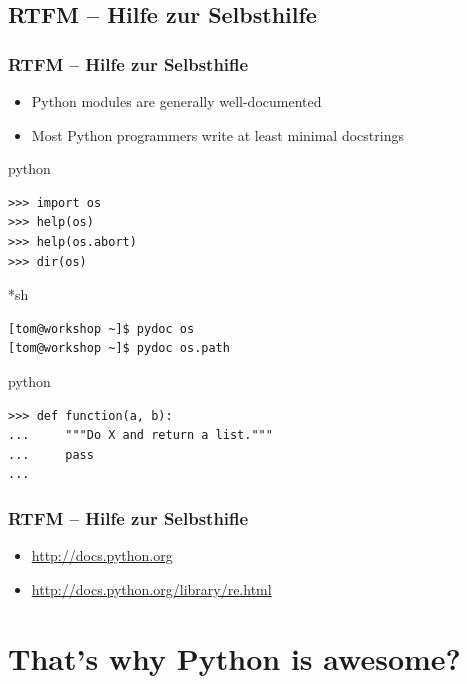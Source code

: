 \documentclass{beamer}
\begin{document}
\subsection{RTFM -- Hilfe zur Selbsthilfe}
\begin{frame}[fragile]
	\frametitle{RTFM -- Hilfe zur Selbsthifle}

	\begin{itemize}
		\item Python modules are generally well-documented
		\item Most Python programmers write at least minimal docstrings
	\end{itemize}

\pause

	\begin{exampleblock}{python}
	\begin{lstlisting}
>>> import os
>>> help(os)
>>> help(os.abort)
>>> dir(os)
	\end{lstlisting}
	\end{exampleblock}

\pause

	\begin{exampleblock}{*sh}
	\begin{lstlisting}[language=bash]
[tom@workshop ~]$ pydoc os
[tom@workshop ~]$ pydoc os.path
	\end{lstlisting}
	\end{exampleblock}

\pause

	\begin{exampleblock}{python}
	\begin{lstlisting}
>>> def function(a, b):
...     """Do X and return a list."""
...     pass
...
	\end{lstlisting}
	\end{exampleblock}
\end{frame}

\begin{frame}[fragile]
	\frametitle{RTFM -- Hilfe zur Selbsthifle}
	
	\begin{itemize}
		\item \url{http://docs.python.org}
		\item \url{http://docs.python.org/library/re.html}
	\end{itemize}

\end{frame}

\section{That's why Python is awesome?}
\end{document}
